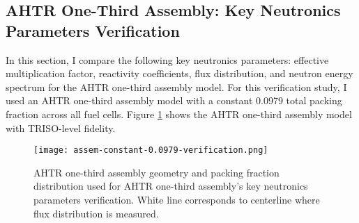 \subsection{AHTR One-Third Assembly: Key Neutronics Parameters Verification}
In this section, I compare the following key neutronics parameters: effective multiplication 
factor, reactivity coefficients, flux distribution, and neutron energy spectrum for the 
\gls{AHTR} one-third assembly model. 
For this verification study, I used an AHTR one-third assembly model with a constant 0.0979 total 
packing fraction across all fuel cells.  
Figure \ref{fig:ahtr-assem-verification} shows the \gls{AHTR} one-third assembly 
model with TRISO-level fidelity.
\begin{figure}[htbp]
    \centering
    \texttt{[image: assem-constant-0.0979-verification.png]}
    \caption{AHTR one-third assembly geometry and packing fraction distribution used for AHTR 
    one-third assembly's key neutronics parameters verification. White line corresponds to 
    centerline where flux distribution is measured. }  
    \label{fig:ahtr-assem-verification}
\end{figure}

